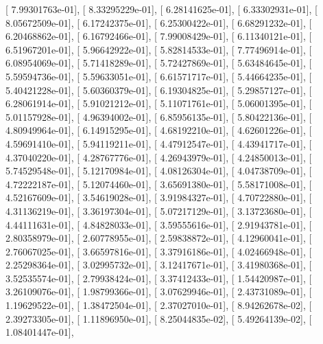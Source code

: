 \documentclass{article}
\begin{document}
       [  7.99301763e-01],
       [  8.33295229e-01],
       [  6.28141625e-01],
       [  6.33302931e-01],
       [  8.05672509e-01],
       [  6.17242375e-01],
       [  6.25300422e-01],
       [  6.68291232e-01],
       [  6.20468862e-01],
       [  6.16792466e-01],
       [  7.99008429e-01],
       [  6.11340121e-01],
       [  6.51967201e-01],
       [  5.96642922e-01],
       [  5.82814533e-01],
       [  7.77496914e-01],
       [  6.08954069e-01],
       [  5.71418289e-01],
       [  5.72427869e-01],
       [  5.63484645e-01],
       [  5.59594736e-01],
       [  5.59633051e-01],
       [  6.61571717e-01],
       [  5.44664235e-01],
       [  5.40421228e-01],
       [  5.60360379e-01],
       [  6.19304825e-01],
       [  5.29857127e-01],
       [  6.28061914e-01],
       [  5.91021212e-01],
       [  5.11071761e-01],
       [  5.06001395e-01],
       [  5.01157928e-01],
       [  4.96394002e-01],
       [  6.85956135e-01],
       [  5.80422136e-01],
       [  4.80949964e-01],
       [  6.14915295e-01],
       [  4.68192210e-01],
       [  4.62601226e-01],
       [  4.59691410e-01],
       [  5.94119211e-01],
       [  4.47912547e-01],
       [  4.43941717e-01],
       [  4.37040220e-01],
       [  4.28767776e-01],
       [  4.26943979e-01],
       [  4.24850013e-01],
       [  5.74529548e-01],
       [  5.12170984e-01],
       [  4.08126304e-01],
       [  4.04738709e-01],
       [  4.72222187e-01],
       [  5.12074460e-01],
       [  3.65691380e-01],
       [  5.58171008e-01],
       [  4.52167609e-01],
       [  3.54619028e-01],
       [  3.91984327e-01],
       [  4.70722880e-01],
       [  4.31136219e-01],
       [  3.36197304e-01],
       [  5.07217129e-01],
       [  3.13723680e-01],
       [  4.44111631e-01],
       [  4.84828033e-01],
       [  3.59555616e-01],
       [  2.91943781e-01],
       [  2.80358979e-01],
       [  2.60778955e-01],
       [  2.59838872e-01],
       [  4.12960041e-01],
       [  2.76067025e-01],
       [  3.66597816e-01],
       [  3.37916186e-01],
       [  4.02466948e-01],
       [  2.25298364e-01],
       [  3.02995732e-01],
       [  3.12417671e-01],
       [  3.41980368e-01],
       [  3.52535574e-01],
       [  2.79938424e-01],
       [  3.37412433e-01],
       [  1.54420987e-01],
       [  3.26109076e-01],
       [  1.98799366e-01],
       [  3.07629946e-01],
       [  2.43731089e-01],
       [  1.19629522e-01],
       [  1.38472504e-01],
       [  2.37027010e-01],
       [  8.94262678e-02],
       [  2.39273305e-01],
       [  1.11896950e-01],
       [  8.25044835e-02],
       [  5.49264139e-02],
       [  1.08401447e-01],
\end{document}
